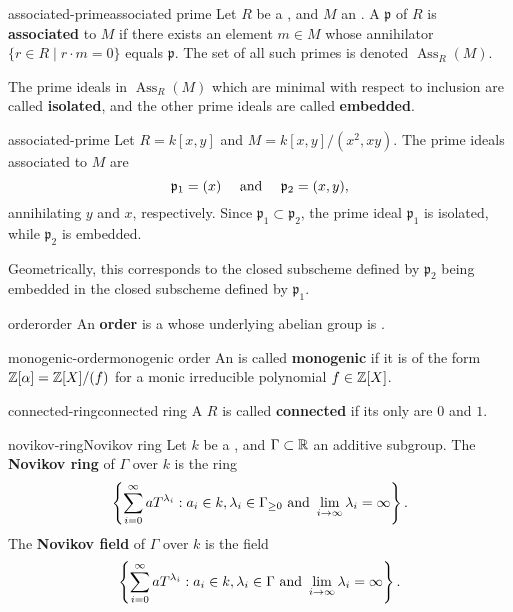 \begin{topic}{associated-prime}{associated prime}
    Let $R$ be a , and $M$ an . A  $\mathfrak{p}$ of $R$ is \textbf{associated} to $M$ if there exists an element $m \in M$ whose annihilator $\{ r \in R \mid r \cdot m = 0 \}$ equals $\mathfrak{p}$. The set of all such primes is denoted $\operatorname{Ass}_R(M)$.
    
    The prime ideals in $\operatorname{Ass}_R(M)$ which are minimal with respect to inclusion are called \textbf{isolated}, and the other prime ideals are called \textbf{embedded}.
\end{topic}

\begin{example}{associated-prime}
    Let $R = k[x, y]$ and $M = k[x, y] / (x^2, xy)$. The prime ideals associated to $M$ are
    \[ \mathfrak{p}_1 = (x) \quad \textup{ and } \quad \mathfrak{p}_2 = (x, y) , \]
    annihilating $y$ and $x$, respectively. Since $\mathfrak{p}_1 \subset \mathfrak{p}_2$, the prime ideal $\mathfrak{p}_1$ is isolated, while $\mathfrak{p}_2$ is embedded.
    
    Geometrically, this corresponds to the closed subscheme defined by $\mathfrak{p}_2$ being embedded in the closed subscheme defined by $\mathfrak{p}_1$.
\end{example}

\begin{topic}{order}{order}
    An \textbf{order} is a  whose underlying abelian group is .
\end{topic}

\begin{topic}{monogenic-order}{monogenic order}
    An  is called \textbf{monogenic} if it is of the form $\mathbb{Z}[\alpha] = \mathbb{Z}[X] / (f)$ for a monic irreducible polynomial $f \in \mathbb{Z}[X]$.
\end{topic}

\begin{topic}{connected-ring}{connected ring}
    A  $R$ is called \textbf{connected} if its only  are $0$ and $1$.
\end{topic}

\begin{topic}{novikov-ring}{Novikov ring}
    Let $k$ be a , and $\Gamma \subset \mathbb{R}$ an additive subgroup. The \textbf{Novikov ring} of $\Gamma$ over $k$ is the ring
    \[ \left\{ \sum_{i = 0}^{\infty} a T^{\lambda_i} : a_i \in k, \lambda_i \in \Gamma_{\ge 0} \textup{ and } \lim_{i \to \infty} \lambda_i = \infty \right\} . \]
    The \textbf{Novikov field} of $\Gamma$ over $k$ is the field
    \[ \left\{ \sum_{i = 0}^{\infty} a T^{\lambda_i} : a_i \in k, \lambda_i \in \Gamma \textup{ and } \lim_{i \to \infty} \lambda_i = \infty \right\} . \]
\end{topic}
